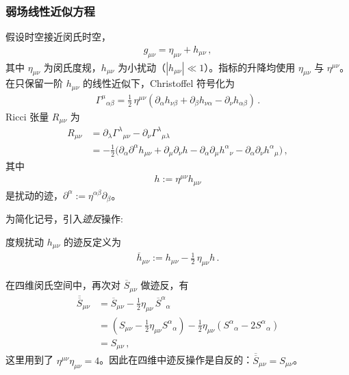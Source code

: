 \subsubsection{弱场线性近似方程}

假设时空接近闵氏时空，
\begin{align}
g_{\mu\nu} = \eta_{\mu\nu} + h_{\mu\nu}\,,
\end{align}
其中 $\eta_{\mu\nu}$ 为闵氏度规，$h_{\mu\nu}$ 为小扰动（$|h_{\mu\nu}|\ll 1$）。指标的升降均使用 $\eta_{\mu\nu}$ 与 $\eta^{\mu\nu}$。在只保留一阶 $h_{\mu\nu}$ 的线性近似下，Christoffel 符号化为
\begin{align}
\Gamma^{\mu}{}_{\alpha\beta}
=
\frac{1}{2}\,
\eta^{\mu\nu}
\left(
  \partial_{\alpha}h_{\nu\beta}
  + \partial_{\beta}h_{\nu\alpha}
  - \partial_{\nu}h_{\alpha\beta}
\right)\,.
\end{align}
Ricci 张量 $R_{\mu\nu}$ 为
\begin{align}
R_{\mu\nu}
&=
\partial_{\lambda}\Gamma^{\lambda}{}_{\mu\nu}
-
\partial_{\nu}\Gamma^{\lambda}{}_{\mu\lambda}
\\[0.3em]
&=
-\frac{1}{2}
\Big(
  \partial_{\alpha}\partial^{\alpha}h_{\mu\nu}
  + \partial_{\mu}\partial_{\nu}h
  - \partial_{\alpha}\partial_{\mu}h^{\alpha}{}_{\nu}
  - \partial_{\alpha}\partial_{\nu}h^{\alpha}{}_{\mu}
\Big)\,,
\end{align}
其中
\begin{align}
h := \eta^{\mu\nu}h_{\mu\nu}
\end{align}
是扰动的迹，$\partial^{\alpha} := \eta^{\alpha\beta}\partial_{\beta}$。

为简化记号，引入\emph{迹反}操作:
\begin{definition}[迹反扰动张量]
度规扰动 $h_{\mu\nu}$ 的迹反定义为
\begin{align}
\overline{h}_{\mu\nu}
:=
h_{\mu\nu}
-
\frac{1}{2}\,
\eta_{\mu\nu}h\,.
\end{align}
\end{definition}

\begin{derivationnote}[四维中迹反操作的自反性]
在四维闵氏空间中，再次对 $\overline{S}_{\mu\nu}$ 做迹反，有
\begin{align}
\overline{\overline{S}}_{\mu\nu}
&=
\overline{S}_{\mu\nu}
-
\frac{1}{2}\eta_{\mu\nu}\,\overline{S}^{\alpha}{}_{\alpha}
\\[0.3em]
&=
\left(
  S_{\mu\nu}
  -
  \frac{1}{2}\eta_{\mu\nu}S^{\alpha}{}_{\alpha}
\right)
-
\frac{1}{2}\eta_{\mu\nu}
\left(
  S^{\alpha}{}_{\alpha}
  -
  2 S^{\alpha}{}_{\alpha}
\right)
\\[0.3em]
&=
S_{\mu\nu}\,,
\end{align}
这里用到了 $\eta^{\mu\nu}\eta_{\mu\nu}=4$。因此在四维中迹反操作是自反的：$\overline{\overline{S}}_{\mu\nu}=S_{\mu\nu}$。
\end{derivationnote}


